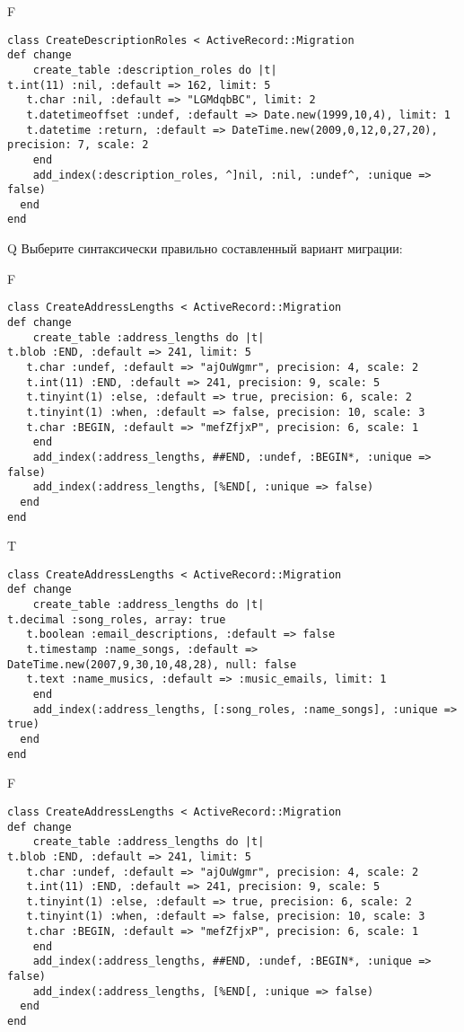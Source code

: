 F
\begin{verbatim}
class CreateDescriptionRoles < ActiveRecord::Migration
def change
	create_table :description_roles do |t|
t.int(11) :nil, :default => 162, limit: 5
   t.char :nil, :default => "LGMdqbBC", limit: 2
   t.datetimeoffset :undef, :default => Date.new(1999,10,4), limit: 1
   t.datetime :return, :default => DateTime.new(2009,0,12,0,27,20), precision: 7, scale: 2
   	end
	add_index(:description_roles, ^]nil, :nil, :undef^, :unique => false)
  end 
end

\end{verbatim}

Q
Выберите синтаксически правильно составленный вариант миграции:

F
\begin{verbatim}
class CreateAddressLengths < ActiveRecord::Migration
def change
	create_table :address_lengths do |t|
t.blob :END, :default => 241, limit: 5
   t.char :undef, :default => "ajOuWgmr", precision: 4, scale: 2
   t.int(11) :END, :default => 241, precision: 9, scale: 5
   t.tinyint(1) :else, :default => true, precision: 6, scale: 2
   t.tinyint(1) :when, :default => false, precision: 10, scale: 3
   t.char :BEGIN, :default => "mefZfjxP", precision: 6, scale: 1
   	end
	add_index(:address_lengths, ##END, :undef, :BEGIN*, :unique => false)
 	add_index(:address_lengths, [%END[, :unique => false)
  end 
end

\end{verbatim}

T
\begin{verbatim}
class CreateAddressLengths < ActiveRecord::Migration
def change
	create_table :address_lengths do |t|
t.decimal :song_roles, array: true
   t.boolean :email_descriptions, :default => false
   t.timestamp :name_songs, :default => DateTime.new(2007,9,30,10,48,28), null: false
   t.text :name_musics, :default => :music_emails, limit: 1
   	end
	add_index(:address_lengths, [:song_roles, :name_songs], :unique => true)
  end 
end

\end{verbatim}

F
\begin{verbatim}
class CreateAddressLengths < ActiveRecord::Migration
def change
	create_table :address_lengths do |t|
t.blob :END, :default => 241, limit: 5
   t.char :undef, :default => "ajOuWgmr", precision: 4, scale: 2
   t.int(11) :END, :default => 241, precision: 9, scale: 5
   t.tinyint(1) :else, :default => true, precision: 6, scale: 2
   t.tinyint(1) :when, :default => false, precision: 10, scale: 3
   t.char :BEGIN, :default => "mefZfjxP", precision: 6, scale: 1
   	end
	add_index(:address_lengths, ##END, :undef, :BEGIN*, :unique => false)
 	add_index(:address_lengths, [%END[, :unique => false)
  end 
end

\end{verbatim}

